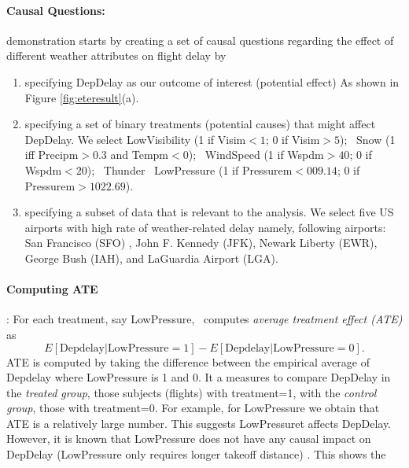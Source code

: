   \paragraph{\bf Causal Questions:} demonstration starts by creating a set of causal questions regarding the effect of different weather attributes on flight delay by
    \begin{enumerate}
      \item specifying DepDelay as our outcome of interest (potential effect) As shown in Figure \ref{fig:eteresult}(a).
      \item specifying a set of binary treatments (potential causes) that might affect DepDelay. We select LowVisibility (1 if Visim$<1$; 0 if Visim$>5$); \ Snow (1 iff Precipm$>0.3$ and Tempm$<0$); \ WindSpeed (1 if Wspdm$>40$; 0 if Wspdm$<20$); \  Thunder \ LowPressure (1 if Pressurem$<009.14$; 0 if Pressurem$>1022.69$).
      
      \item specifying a subset of data that is relevant to the analysis.  We select five US airports with high rate of weather-related delay namely,
 following airports: San Francisco (SFO) , John F. Kennedy (JFK), Newark Liberty (EWR), George Bush (IAH), and LaGuardia Airport (LGA). 
\end{enumerate}


 \paragraph{ \bf Computing ATE}: For each treatment, say LowPressure, \GSQL\ computes {\em average treatment effect (ATE)} as $$E[\text{Depdelay}|\text{LowPressure}=1] - E[\text{Depdelay}|\text{LowPressure}=0].$$
 ATE is computed by taking the difference between the empirical average of Depdelay where LowPressure is 1 and 0. It a measures to compare DepDelay in the {\em treated group}, those subjects (flights) with treatment=1, with the {\em control group}, those with treatment=0.
 For example, for LowPressure we obtain that ATE is a relatively large number. This suggests  LowPressuret affects DepDelay. However, it is known that
  LowPressure does not have any causal impact on DepDelay (LowPressure only requires longer takeoff distance) \cite{FAA08}.  This shows the

